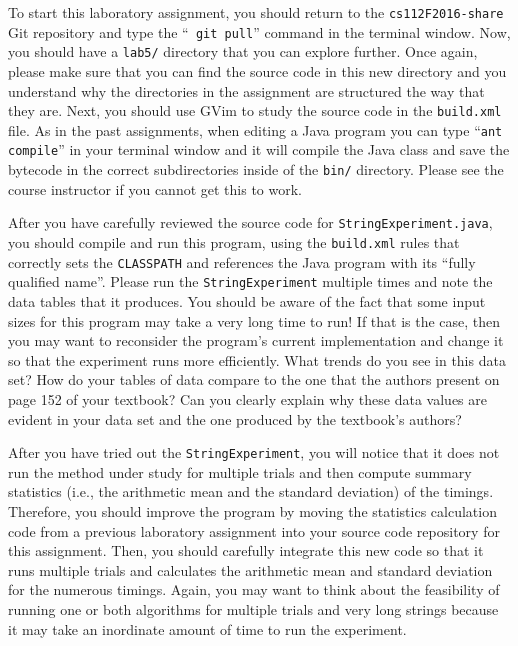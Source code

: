To start this laboratory assignment, you should return to the {\tt cs112F2016-share} Git repository and type the ``{\tt
git pull}'' command in the terminal window.  Now, you should have a {\tt lab5/} directory that you can explore further.
Once again, please make sure that you can find the source code in this new directory and you understand why the
directories in the assignment are structured the way that they are. Next, you should use GVim to study the source code
in the {\tt build.xml} file.  As in the past assignments, when editing a Java program you can type ``{\tt ant compile}''
in your terminal window and it will compile the Java class and save the bytecode in the correct subdirectories inside of
the {\tt bin/} directory. Please see the course instructor if you cannot get this to work.

After you have carefully reviewed the source code for {\tt StringExperiment.java}, you should compile and run this
program, using the {\tt build.xml} rules that correctly sets the {\tt CLASSPATH} and references the Java program with
its ``fully qualified name''. Please run the {\tt StringExperiment} multiple times and note the data tables that it
produces. You should be aware of the fact that some input sizes for this program may take a very long time to run! If
that is the case, then you may want to reconsider the program's current implementation and change it so that the
experiment runs more efficiently. What trends do you see in this data set? How do your tables of data compare to the one
that the authors present on page 152 of your textbook? Can you clearly explain why these data values are evident in your
data set and the one produced by the textbook's authors?

After you have tried out the {\tt StringExperiment}, you will notice that it does not run the method under study for
multiple trials and then compute summary statistics (i.e., the arithmetic mean and the standard deviation) of the
timings. Therefore, you should improve the program by moving the statistics calculation code from a previous laboratory
assignment into your source code repository for this assignment.  Then, you should carefully integrate this new code so
that it runs multiple trials and calculates the arithmetic mean and standard deviation for the numerous timings. Again,
you may want to think about the feasibility of running one or both algorithms for multiple trials and very long strings
because it may take an inordinate amount of time to run the experiment.

